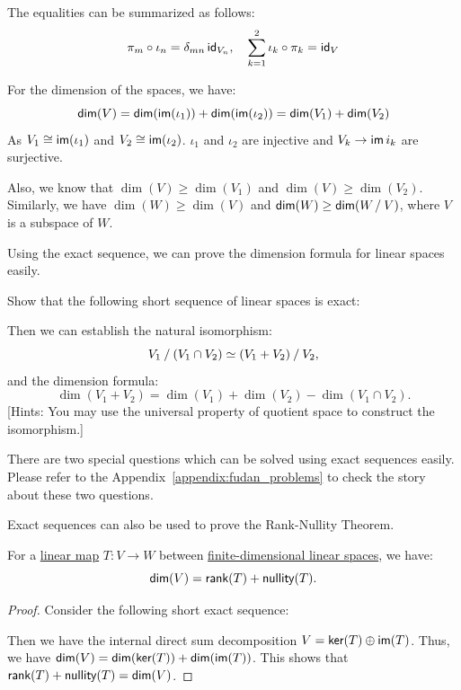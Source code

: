 The equalities can be summarized as follows:
\[
  \pi_m \circ \iota_n = \delta_{mn} \id_{V_n}, \quad \sum_{k=1}^{2} \iota_k \circ \pi_k = \id_V
\]

For the dimension of the spaces, we have:
\[
  \dim(V) = \dim(\im(\iota_1)) + \dim(\im(\iota_2)) = \dim(V_1) + \dim(V_2)
\]
As $V_1 \cong \im(\iota_1)$ and $V_2 \cong \im(\iota_2)$. $\iota_1$ and $\iota_2$ are injective and $V_k \to \im{i_k}$ are surjective.

Also, we know that $\dim(V) \geq \dim(V_1)$ and $\dim(V) \geq \dim(V_2)$. Similarly, we have $\dim(W) \geq \dim(V)$ and $\dim(W) \geq \dim(\quotient{W}{V})$, where $V$ is a subspace of $W$.

Using the exact sequence, we can prove the dimension formula for linear spaces easily.
\begin{exercise}
  Show that the following short sequence of linear spaces is exact:
  \begin{center}
  \end{center}
  Then we can establish the natural isomorphism:
  \[
    \quotient{V_1}{(V_1 \cap V_2)} \simeq \quotient{(V_1 + V_2)}{V_2},
  \]
  and the dimension formula:
  \[
    \dim(V_1 + V_2) = \dim(V_1) + \dim(V_2) - \dim(V_1 \cap V_2).
  \]
  [Hints: You may use the universal property of quotient space to construct the isomorphism.]
\end{exercise}

There are two special questions which can be solved using exact sequences easily. Please refer to the Appendix~\ref{appendix:fudan_problems} to check the story about these two questions.

Exact sequences can also be used to prove the Rank-Nullity Theorem.
\begin{theorem}
  For a \hyperref[def:linear_map]{linear map} $T \colon V \to W$ between \hyperref[def:finite_dimensional_linear_space]{finite-dimensional linear spaces}, we have:
  \begin{equation}
    \dim(V) = \rank(T) + \nullity(T).
  \end{equation}
\end{theorem}
\begin{proof}
  Consider the following short exact sequence:
  \begin{center}
  \end{center}
  Then we have the internal direct sum decomposition $V = \ker(T) \oplus \im(T)$. Thus, we have $\dim(V) = \dim(\ker(T)) + \dim(\im(T))$. This shows that $\rank(T) + \nullity(T) = \dim(V)$.
\end{proof}

